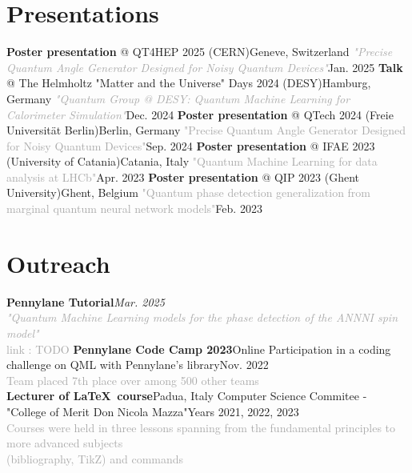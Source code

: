 \documentclass[letterpaper,11pt]{article}
\begin{document}
\section{Presentations}
  \resumeSubHeadingListStart
    \resumeSubheadingUnbold
      {\textbf{Poster presentation} @ QT4HEP 2025 (CERN)}{Geneve, Switzerland}
      {\textcolor{darkgray}{\textit{"Precise Quantum Angle Generator Designed for Noisy Quantum Devices"}}}{Jan. 2025}
    \resumeSubheadingUnbold
      {\textbf{Talk} @ The Helmholtz "Matter and the Universe" Days 2024 (DESY)}{Hamburg, Germany}
      {\textcolor{darkgray}{\textit{"Quantum Group @ DESY: Quantum Machine Learning for Calorimeter Simulation"}}}{Dec. 2024}
    \resumeSubheadingUnbold
      {\textbf{Poster presentation} @ QTech 2024 (Freie Universität Berlin)}{Berlin, Germany}
      {\textcolor{darkgray}{"Precise Quantum Angle Generator Designed for Noisy Quantum Devices"}}{Sep. 2024}
    \resumeSubheadingUnbold
      {\textbf{Poster presentation} @ IFAE 2023 (University of Catania)}{Catania, Italy}
      {\textcolor{darkgray}{"Quantum Machine Learning for data analysis at LHCb"}}{Apr. 2023}
    \resumeSubheadingUnbold
      {\textbf{Poster presentation} @ QIP 2023 (Ghent University)}{Ghent, Belgium}
      {\textcolor{darkgray}{"Quantum phase detection generalization from marginal quantum neural network models"}}{Feb. 2023}

  \resumeSubHeadingListEnd
%
\section{Outreach}
  \resumeSubHeadingListStart
    \resumeSubheadingUnbold
      {\textbf{Pennylane Tutorial}}{\small\textit{Mar. 2025}}
      {}{}
      {
        ~\\[-.3cm]
        \small\textcolor{darkgray}{
          \hspace*{1cm}\textit{"Quantum Machine Learning models for the phase detection of the ANNNI spin model"}\\ 
          \hspace*{1cm}link : TODO}
      }
    \resumeSubheadingUnbold
      {\textbf{Pennylane Code Camp 2023}}{Online}
      {Participation in a coding challenge on QML with Pennylane's library}{Nov. 2022}
      {
        ~\\[0.15cm]
        \small\textcolor{darkgray}{
          \hspace*{1cm} Team placed 7th place over among 500 other teams\\
          }
      }
    \resumeSubheadingUnbold
      {\textbf{Lecturer of \LaTeX\, course}}{Padua, Italy}
      {Computer Science Commitee - "College of Merit Don Nicola Mazza"}{Years 2021, 2022, 2023}
      {
        ~\\[0.15cm]
        \small\textcolor{darkgray}{
          \hspace*{1cm}Courses were held in three lessons spanning from the fundamental principles to more advanced subjects\\
          \hspace*{1cm}(bibliography, TikZ) and commands}
      }
  \resumeSubHeadingListEnd
\end{document}
